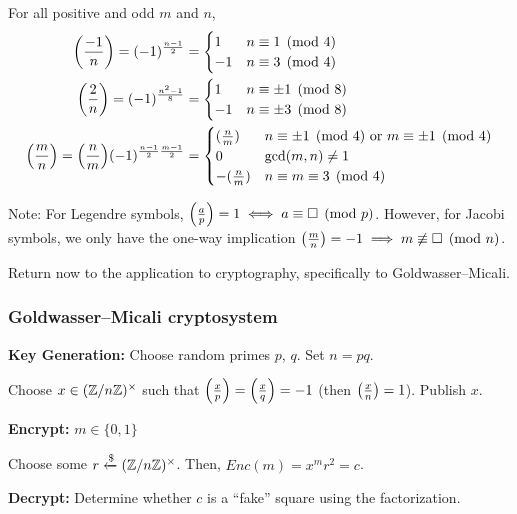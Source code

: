 \documentclass[notes]{agony}
\newcommand{\xgets}{\xleftarrow}
\newcommand{\ndgets}{\xgets{\mathdollar}}
\newcommand{\leg}[2]{\qty(\frac{#1}{#2})}
\begin{document}
\begin{theorem}[Jacobi]
  For all positive and odd $m$ and $n$,
  \begin{align*}
    \qty(\frac{-1}{n}) = (-1)^{\frac{n-1}{2}}
     & = \begin{cases}1 & n \equiv 1 \pmod 4 \\ -1 & n \equiv 3 \pmod 4\end{cases}         \\
    \qty(\frac{2}{n})  = (-1)^{\frac{n^2-1}{8}}
     & = \begin{cases}1 & n \equiv \pm 1 \pmod 8 \\ -1 & n \equiv \pm 3 \pmod 8\end{cases} \\
    \qty(\frac{m}{n})  = \qty(\frac{n}{m})(-1)^{\frac{n-1}{2}\frac{m-1}{2}}
     & = \begin{cases}
           (\frac{n}{m})  & n \equiv \pm 1 \pmod 4 \text{ or } m \equiv \pm 1 \pmod 4 \\
           0              & \gcd(m,n) \neq 1                                          \\
           -(\frac{n}{m}) & n \equiv m \equiv 3 \pmod 4
         \end{cases}
  \end{align*}
\end{theorem}

Note: For Legendre symbols, $\leg{a}{p} = 1 \iff a \equiv \square \pmod p$.
However, for Jacobi symbols, we only have the one-way implication
$\leg{m}{n} = -1 \implies m \not\equiv \square \pmod n$.

Return now to the application to cryptography,
specifically to Goldwasser--Micali.

\subsubsection{Goldwasser--Micali cryptosystem}

\textbf{Key Generation: } Choose random primes $p$, $q$. Set $n = pq$.

Choose $x \in (\mathbb{Z}/n\mathbb{Z})^\times$ such that
$\leg{x}{p} = \leg{x}{q} = -1$ (then $\leg{x}{n} = 1$).
Publish $x$.

\textbf{Encrypt:} $m \in \{0,1\}$

Choose some $r \ndgets (\Z/n\Z)^\times$.
Then, $Enc(m) = x^m r^2 = c$.

\textbf{Decrypt:} Determine whether $c$ is a ``fake'' square using the factorization.
\end{document}
